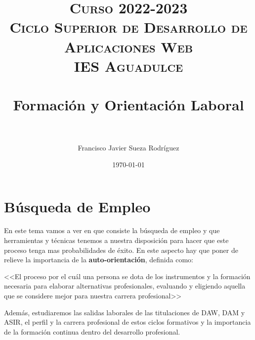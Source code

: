 


\title{	
\normalfont \normalsize 
\textsc{{\bfseries Curso 2022-2023} \\ Ciclo Superior de Desarrollo de Aplicaciones Web \\ IES Aguadulce} \\ [25pt] 
\horrule{0.5pt} \\[0.4cm] 
\huge Formación y Orientación Laboral \\ 
\horrule{0.5pt} \\[0.4cm] 
}

\author{Francisco Javier Sueza Rodríguez} 
\date{\normalsize\today} 




\maketitle

\newpage 

\tableofcontents 



\newpage

\chapter{Búsqueda de Empleo}
En este tema vamos a ver en que consiste la búsqueda de empleo y que herramientas y técnicas tenemos a nuestra disposición para hacer que este proceso tenga mas probabilidades de éxito. En este aspecto hay que poner de relieve la importancia de la {\bfseries auto-orientación}, definida como:

 <<El proceso por el cuál una persona se dota de los instrumentos y la formación necesaria para elaborar alternativas profesionales, evaluando y eligiendo aquella que se considere mejor para nuestra carrera profesional>>\cite{apuntes01}
 
 Además, estudiaremos las salidas laborales de las titulaciones de DAW, DAM y ASIR, el perfil y la carrera profesional de estos ciclos formativos y la importancia de la formación continua dentro del desarrollo profesional.  
 
